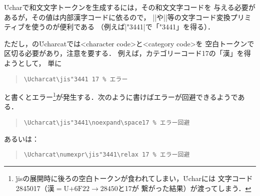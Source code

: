 \documentclass[a4paper,11pt,nomag]{jsarticle}
\begin{document}
\begin{dangerous}
  \.{Uchar}で和文文字トークンを生成するには，その和文文字コードを
  与える必要があるが，その値は内部漢字コードに依るので，
  |\jis|や|\euc|等の文字コード変換プリミティブを使うのが便利である
  （例えば|\Uchar\jis"3441|で「\Uchar\jis"3441」を得る）．

  ただし，\eupTeX の\.{Ucharcat}では<character code>と<category code>を
  空白トークンで区切る必要があり，注意を要する．
  例えば，カテゴリーコード17の「漢」を得ようとして，
  単に
  \begin{quote}
	\verb+\Ucharcat\jis"3441 17 % エラー+
  \end{quote}
  と書くとエラー\footnote{%
    \.{jis}の展開時に後ろの空白トークンが食われてしまい，\.{Uchar}には
    文字コード2845017（$\text{漢}=\text{U+6F22}\rightarrow 28450$と17が
    繋がった結果）が渡ってしまう．
  }が発生する．次のように書けばエラーが回避できるようである．
  \begin{quote}
	\verb+\Ucharcat\jis"3441\noexpand\space17 % エラー回避+
  \end{quote}
  あるいは：
  \begin{quote}
	\verb+\Ucharcat\numexpr\jis"3441\relax 17 % エラー回避+
  \end{quote}
\end{dangerous}
\end{document}
